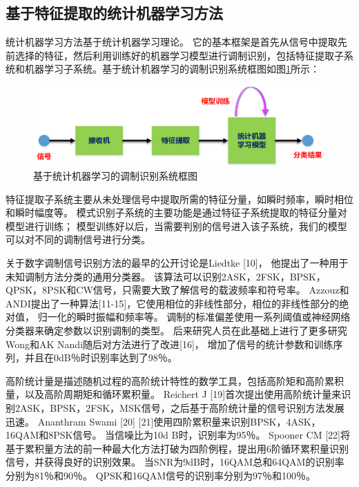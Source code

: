 \subsection{基于特征提取的统计机器学习方法}

统计机器学习方法基于统计机器学习理论。 
它的基本框架是首先从信号中提取先前选择的特征，然后利用训练好的机器学习模型进行调制识别，包括特征提取子系统和机器学习子系统。基于统计机器学习的调制识别系统框图如图\ref{sec:fig_1_1}所示：\par
\begin{figure}
	\centering
	\includegraphics[scale=0.6]{figures/chapter_1/fig_1_1}
	\caption{基于统计机器学习的调制识别系统框图} \label{sec:fig_1_1}
\end{figure}
特征提取子系统主要从未处理信号中提取所需的特征分量，如瞬时频率，瞬时相位和瞬时幅度等。 
模式识别子系统的主要功能是通过特征子系统提取的特征分量对模型进行训练；
模型训练好以后，当需要判别的信号进入该子系统，我们的模型可以对不同的调制信号进行分类。\par

关于数字调制信号识别方法的最早的公开讨论是Liedtke [10]， 他提出了一种用于未知调制方法分类的通用分类器。 
该算法可以识别2ASK，2FSK，BPSK，QPSK，8PSK和CW信号，只需要大致了解信号的载波频率和符号率。 Azzouz和ANDI提出了一种算法[11-15]，它使用相位的非线性部分，相位的非线性部分的绝对值，
归一化的瞬时振幅和频率等。
调制的标准偏差使用一系列阈值或神经网络分类器来确定参数以识别调制的类型。 后来研究人员在此基础上进行了更多研究 Wong和AK Nandi随后对方法进行了改进[16]，
增加了信号的统计参数和训练序列，并且在0dB％时识别率达到了98％。\par

高阶统计量是描述随机过程的高阶统计特性的数学工具，包括高阶矩和高阶累积量，以及高阶周期矩和循环累积量。 Reichert J [19]首次提出使用高阶统计量来识别2ASK，BPSK，2FSK，MSK信号，之后基于高阶统计量的信号识别方法发展迅速。
 Ananthram Swami [20] [21]使用四阶累积量来识别BPSK，4ASK，16QAM和8PSK信号。
当信噪比为10d B时，识别率为95％。 Spooner CM [22]将基于累积量方法的前一种最大化方法打破为四阶例程，提出用6阶循环累积量识别信号，并获得良好的识别效果。
当SNR为9dB时，16QAM总和64QAM的识别率分别为81％和90％。 QPSK和16QAM信号的识别率分别为97％和100％。\par

